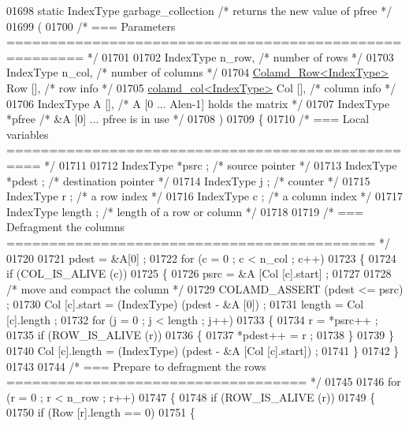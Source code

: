\begin{DoxyCode}
{{{{{{{{{{{{{{{{{{{{{{{{{{{{01698 \textcolor{keyword}{static} IndexType garbage\_collection  \textcolor{comment}{/* returns the new value of pfree */}
01699   (
01700     \textcolor{comment}{/* === Parameters ======================================================= */}
01701     
01702     IndexType n\_row,      \textcolor{comment}{/* number of rows */}
01703     IndexType n\_col,      \textcolor{comment}{/* number of columns */}
01704     \hyperlink{structinternal_1_1_colamd___row}{Colamd\_Row<IndexType>} Row [],    \textcolor{comment}{/* row info */}
01705     \hyperlink{structinternal_1_1colamd__col}{colamd\_col<IndexType>} Col [],    \textcolor{comment}{/* column info */}
01706     IndexType A [],     \textcolor{comment}{/* A [0 ... Alen-1] holds the matrix */}
01707     IndexType *pfree      \textcolor{comment}{/* &A [0] ... pfree is in use */}
01708     )
01709 \{
01710   \textcolor{comment}{/* === Local variables ================================================== */}
01711 
01712   IndexType *psrc ;     \textcolor{comment}{/* source pointer */}
01713   IndexType *pdest ;    \textcolor{comment}{/* destination pointer */}
01714   IndexType j ;     \textcolor{comment}{/* counter */}
01715   IndexType r ;     \textcolor{comment}{/* a row index */}
01716   IndexType c ;     \textcolor{comment}{/* a column index */}
01717   IndexType length ;    \textcolor{comment}{/* length of a row or column */}
01718 
01719   \textcolor{comment}{/* === Defragment the columns =========================================== */}
01720 
01721   pdest = &A[0] ;
01722   \textcolor{keywordflow}{for} (c = 0 ; c < n\_col ; c++)
01723   \{
01724     \textcolor{keywordflow}{if} (COL\_IS\_ALIVE (c))
01725     \{
01726       psrc = &A [Col [c].start] ;
01727 
01728       \textcolor{comment}{/* move and compact the column */}
01729       COLAMD\_ASSERT (pdest <= psrc) ;
01730       Col [c].start = (IndexType) (pdest - &A [0]) ;
01731       length = Col [c].length ;
01732       \textcolor{keywordflow}{for} (j = 0 ; j < length ; j++)
01733       \{
01734     r = *psrc++ ;
01735     \textcolor{keywordflow}{if} (ROW\_IS\_ALIVE (r))
01736     \{
01737       *pdest++ = r ;
01738     \}
01739       \}
01740       Col [c].length = (IndexType) (pdest - &A [Col [c].start]) ;
01741     \}
01742   \}
01743 
01744   \textcolor{comment}{/* === Prepare to defragment the rows =================================== */}
01745 
01746   \textcolor{keywordflow}{for} (r = 0 ; r < n\_row ; r++)
01747   \{
01748     \textcolor{keywordflow}{if} (ROW\_IS\_ALIVE (r))
01749     \{
01750       \textcolor{keywordflow}{if} (Row [r].length == 0)
01751       \{
}}}}}}}}}}}}}}}}}}}}}}}}}}}}
\end{DoxyCode}
